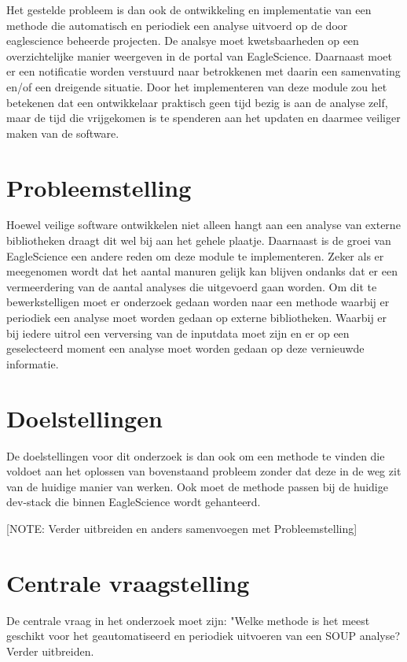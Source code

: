 Het gestelde probleem is dan ook de ontwikkeling en implementatie van een methode die automatisch en periodiek een analyse uitvoerd op de door eaglescience beheerde projecten. De analsye moet kwetsbaarheden op een overzichtelijke manier weergeven in de portal van EagleScience. Daarnaast moet er een notificatie worden verstuurd naar betrokkenen met daarin een samenvating en/of een dreigende situatie.
Door het implementeren van deze module zou het betekenen dat een ontwikkelaar praktisch geen tijd bezig is aan de analyse zelf, maar de tijd die vrijgekomen is te spenderen aan het updaten en daarmee veiliger maken van de software.


\section{Probleemstelling}\label{sec:probleemstelling}
Hoewel veilige software ontwikkelen niet alleen hangt aan een analyse van externe bibliotheken draagt dit wel bij aan het gehele plaatje. Daarnaast is de groei van EagleScience een andere reden om deze module te implementeren. Zeker als er meegenomen wordt dat het aantal manuren gelijk kan blijven ondanks dat er een vermeerdering van de aantal analyses die uitgevoerd gaan worden. Om dit te bewerkstelligen moet er onderzoek gedaan worden naar een methode waarbij er periodiek een analyse moet worden gedaan op externe bibliotheken. Waarbij er bij iedere uitrol een verversing van de inputdata moet zijn en er op een geselecteerd moment een analyse moet worden gedaan op deze vernieuwde informatie.


\section{Doelstellingen}\label{sec:doelstellingen}
De doelstellingen voor dit onderzoek is dan ook om een methode te vinden die voldoet aan het oplossen van bovenstaand probleem zonder dat deze in de weg zit van de huidige manier van werken. Ook moet de methode passen bij de huidige dev-stack die binnen EagleScience wordt gehanteerd.

[NOTE: Verder uitbreiden en anders samenvoegen met Probleemstelling]


\section{Centrale vraagstelling}\label{sec:centrale-vraagstelling}

De centrale vraag in het onderzoek moet zijn: "Welke methode is het meest geschikt voor het geautomatiseerd en periodiek uitvoeren van een SOUP analyse?
Verder uitbreiden.


